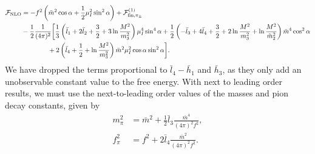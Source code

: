 \begin{align}
    \nonumber
    \mathcal{F}_{\mathrm{NLO}} &=
    - f^2 \left(\bar m^2 \cos \alpha + \frac{1}{2}\mu_I^2 \sin^2 \alpha\right)
    + \mathcal{F}^{(1)}_{\mathrm{fin}, \pi_\pm} \\ \nonumber
    & - \frac{1}{2}\frac{1}{(4 \pi)^2}
    \bigg[
        \frac{1}{3}
        \left( 
            \bar l_1 + 2 \bar l_2 + \frac{3}{2} + 3 \ln \frac{M^2}{m_3^2}
        \right) \mu_I^4 \sin^4 \alpha
        +
        \frac{1}{2}
        \left(
            - \bar l_3 + 4 \bar l_4 + \frac{3}{2} + 2\ln \frac{M^2}{m_3^2}
            + \ln \frac{M^2}{\tilde m^2_2}
        \right) \bar m^4 \cos^2\alpha \\
        & \quad \quad \quad \quad 
        + 2 \left(\bar l_4 + \frac{1}{2} + \ln \frac{M^2}{m_3^2}\right)
        \bar m^2 \mu_I^2 \cos\alpha \sin^2 \alpha
        \label{NLO free energy}
    \bigg].
\end{align}
%
We have dropped the terms proportional to $\bar l_4 - \bar h_1$ and $\bar h_3$, as they only add an unobservable constant value to the free energy.
With next to leading order results, we must use the next-to-leading order values of the masses and pion decay constants, given by~\autocite{gasserChiralPerturbationTheory1984}
%
\begin{align}
    \label{equation bare mass}
    m_\pi^2 & = \bar m^2 + \frac{1}{2}\bar l_3 \frac{\bar m^4}{(4\pi)^2 f^2}, \\
    \label{equation bare decay constant}
    f_\pi^2 & = f^2 + 2\bar l_4\frac{\bar m^2}{(4\pi)^2f^2}.
\end{align}
%


